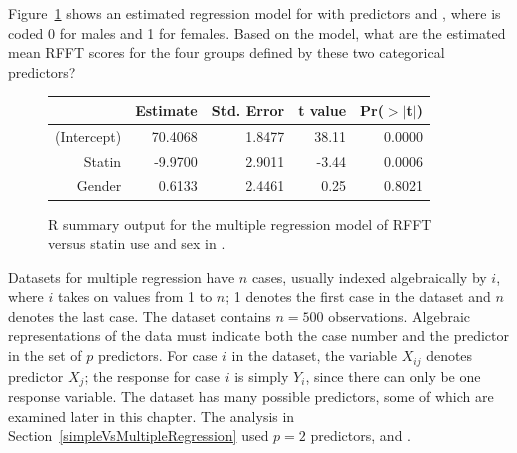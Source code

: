 \begin{exercisewrap}
\begin{nexercise}
Figure~\ref{prevendRFFTStatinGenderRegression} shows an estimated regression model for  with predictors  and , where  is coded 0 for males and 1 for females.\footnotemark{} Based on the model, what are the estimated mean RFFT scores for the four groups defined by these two categorical predictors?\footnotemark{}
\end{nexercise}
\end{exercisewrap}
\addtocounter{footnote}{-1}
\addtocounter{footnote}{1}

\begin{figure}[ht]
\centering
\begin{tabular}{rrrrr}
  \hline
 & Estimate & Std. Error & t value & Pr($>$$|$t$|$) \\ 
  \hline
(Intercept) & 70.4068 & 1.8477 & 38.11 & 0.0000 \\ 
  Statin & -9.9700 & 2.9011 & -3.44 & 0.0006 \\ 
  Gender & 0.6133 & 2.4461 & 0.25 & 0.8021 \\ 
   \hline
\end{tabular}
\caption{\textsf{R} summary output for the multiple regression model of RFFT versus statin use and sex in .}
\label{prevendRFFTStatinGenderRegression}
\end{figure}

Datasets for multiple regression have $n$ cases, usually indexed algebraically by $i$, where $i$ takes on values from 1 to $n$; 1 denotes the first case in the dataset and $n$ denotes the last case.  The dataset  contains $n = 500$ observations.  Algebraic representations of the data must indicate both the case number and the predictor in the set of $p$ predictors. For case $i$ in the dataset, the variable $X_{ij}$ denotes predictor $X_j$; the response for case $i$ is simply $Y_i$, since there can only be one response variable. The dataset  has many possible predictors, some of which are examined later in this chapter.  The analysis in Section~\ref{simpleVsMultipleRegression} used $p=2$ predictors,  and .


